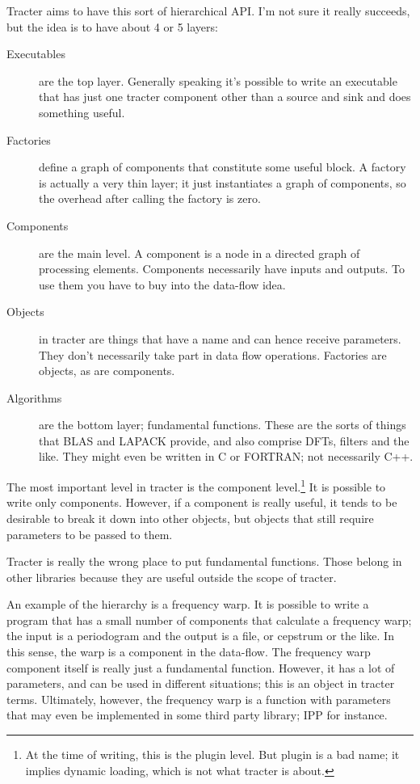 Tracter aims to have this sort of hierarchical API.  I'm not sure it
really succeeds, but the idea is to have about 4 or 5 layers:
\begin{description}
\item[Executables] are the top layer.  Generally speaking it's
  possible to write an executable that has just one tracter component
  other than a source and sink and does something useful.
\item[Factories] define a graph of components that constitute some
  useful block.  A factory is actually a very thin layer; it just
  instantiates a graph of components, so the overhead after calling
  the factory is zero.
\item[Components] are the main level.  A component is a node in a
  directed graph of processing elements.  Components necessarily have
  inputs and outputs.  To use them you have to buy into the data-flow
  idea.
\item[Objects] in tracter are things that have a name and can hence
  receive parameters.  They don't necessarily take part in data flow
  operations.  Factories are objects, as are components.
\item[Algorithms] are the bottom layer; fundamental functions.  These
  are the sorts of things that BLAS and LAPACK provide, and also
  comprise DFTs, filters and the like.  They might even be written in
  C or FORTRAN; not necessarily C++.
\end{description}

The most important level in tracter is the component
level.\footnote{At the time of writing, this is the plugin level.  But
  plugin is a bad name; it implies dynamic loading, which is not what
  tracter is about.}  It is possible to write only components.
However, if a component is really useful, it tends to be desirable to
break it down into other objects, but objects that still require
parameters to be passed to them.

Tracter is really the wrong place to put fundamental functions.  Those
belong in other libraries because they are useful outside the scope of
tracter.

An example of the hierarchy is a frequency warp.  It is possible to
write a program that has a small number of components that calculate a
frequency warp; the input is a periodogram and the output is a file,
or cepstrum or the like.  In this sense, the warp is a component in
the data-flow.  The frequency warp component itself is really just a
fundamental function.  However, it has a lot of parameters, and can be
used in different situations; this is an object in tracter terms.
Ultimately, however, the frequency warp is a function with parameters
that may even be implemented in some third party library; IPP for
instance.

